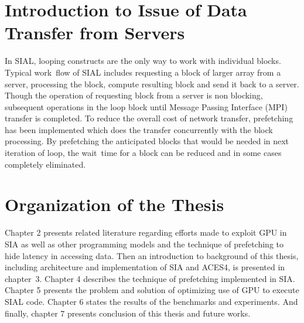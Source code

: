 \section{Introduction to Issue of Data Transfer from Servers}
In SIAL, looping constructs are the only way to work with individual blocks.
Typical work~flow of SIAL includes requesting a block of larger array from a server,
processing the block, compute resulting block and send it back to a server. Though
the operation of requesting block from a server is non blocking, subsequent operations
in the loop block until Message Passing Interface (MPI) transfer is completed. To reduce the overall cost of network
transfer, prefetching has been implemented which does the transfer concurrently
with the block processing. By prefetching the anticipated blocks that would be
needed in next iteration of loop, the wait~time for a block can be reduced and
in some cases completely eliminated.

\section{Organization of the Thesis}
Chapter 2 presents related literature regarding efforts made to exploit GPU in
SIA as well as other programming models and the technique of prefetching to hide
latency in accessing data. Then an introduction to background of this thesis,
including architecture and implementation of SIA and ACES4, is presented in chapter~3.
Chapter 4 describes the technique of prefetching implemented in SIA. Chapter 5
presents the problem and solution of optimizing use of GPU to execute SIAL
code. Chapter 6 states the results of the benchmarks and experiments. And
finally, chapter 7 presents conclusion of this thesis and future works.